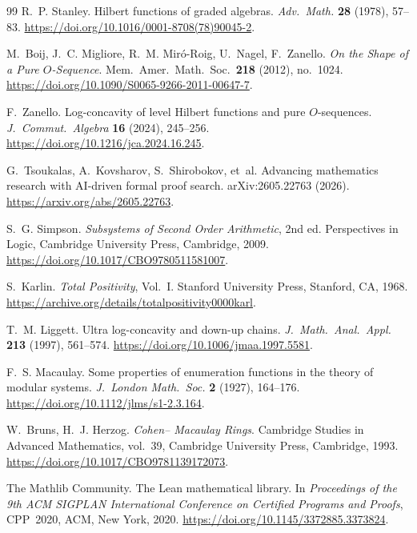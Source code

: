 \documentclass[11pt,reqno]{amsart}
\begin{document}
\begin{thebibliography}{99}
 R.~P. Stanley. \newblock Hilbert functions of graded
algebras. \newblock \emph{Adv.\ Math.} \textbf{28} (1978), 57--83. 
\newblock
\url{https://doi.org/10.1016/0001-8708(78)90045-2}. \medskip

 M.~Boij, J.~C. Migliore, R.~M. Mir\'o-Roig, U.~Nagel,
F.~Zanello. \newblock \emph{On the Shape of a Pure $O$-Sequence}. \newblock
Mem.\ Amer.\ Math.\ Soc.\ \textbf{218} (2012), no.~1024. \newblock
\url{https://doi.org/10.1090/S0065-9266-2011-00647-7}. \medskip

 F.~Zanello. \newblock Log-concavity of level Hilbert
functions and pure $O$-sequences. \newblock \emph{J.\ Commut.\ Algebra} 
\textbf{16} (2024), 245--256. \newblock
\url{https://doi.org/10.1216/jca.2024.16.245}. \medskip

 G.~Tsoukalas, A.~Kovsharov, S.~Shirobokov, et~al. %
\newblock Advancing mathematics research with AI-driven formal proof search. %
\newblock arXiv:2605.22763 (2026). \newblock
\url{https://arxiv.org/abs/2605.22763}. \medskip

 S.~G. Simpson. \newblock \emph{Subsystems of Second
Order Arithmetic}, 2nd ed. \newblock Perspectives in Logic, Cambridge
University Press, Cambridge, 2009. \newblock
\url{https://doi.org/10.1017/CBO9780511581007}. \medskip

 S.~Karlin. \newblock \emph{Total Positivity}, Vol.~I. %
\newblock Stanford University Press, Stanford, CA, 1968. \newblock
\url{https://archive.org/details/totalpositivity0000karl}. \medskip

 T.~M. Liggett. \newblock Ultra log-concavity and
down-up chains. \newblock \emph{J.\ Math.\ Anal.\ Appl.} \textbf{213}
(1997), 561--574. \newblock
\url{https://doi.org/10.1006/jmaa.1997.5581}. \medskip

 F.~S. Macaulay. \newblock Some properties of
enumeration functions in the theory of modular systems. \newblock
\emph{J.\ London Math.\ Soc.} \textbf{2} (1927), 164--176. \newblock
\url{https://doi.org/10.1112/jlms/s1-2.3.164}. \medskip

 W.~Bruns, H.~J. Herzog. \newblock \emph{Cohen--
Macaulay Rings}. \newblock Cambridge Studies in Advanced Mathematics,
vol.~39, Cambridge University Press, Cambridge, 1993. \newblock
\url{https://doi.org/10.1017/CBO9781139172073}. \medskip

 {The Mathlib Community}. \newblock The Lean
mathematical library. \newblock In \emph{Proceedings of the 9th ACM SIGPLAN
International Conference on Certified Programs and Proofs}, CPP~2020, ACM,
New York, 2020. \newblock
\url{https://doi.org/10.1145/3372885.3373824}.
\end{thebibliography}
\end{document}
